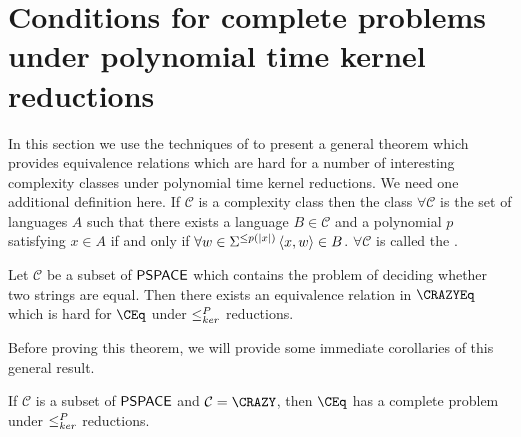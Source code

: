 \section{Conditions for complete problems under polynomial time kernel reductions}
\label{sec:generalcompleteness}

In this section we use the techniques of \autocite[Theorem~8.7]{bcffm} to present a general theorem which provides equivalence relations which are hard for a number of interesting complexity classes under polynomial time kernel reductions.
We need one additional definition here.
If $\mathcal{C}$ is a complexity class then the class $\forall\mathcal{C}$ is the set of languages $A$ such that there exists a language $B\in\mathcal{C}$ and a polynomial $p$ satisfying $x\in A$ if and only if $\forall w\in\Sigma^{\leq p(|x|)} \left\langle x,w\right\rangle\in B$.
$\forall\mathcal{C}$ is called the .

\begin{theorem}\label{thm:generalcompleteness}
  Let $\mathcal{C}$ be a subset of ${\mathsf{PSPACE}}$ which contains the problem of deciding whether two strings are equal.
  Then there exists an equivalence relation in $\CRAZYEq$ which is hard for $\CEq$ under $\leq^{P}_{ker}$ reductions.
\end{theorem}

Before proving this theorem, we will provide some immediate corollaries of this general result.

\begin{corollary}
  If $\mathcal{C}$ is a subset of ${\mathsf{PSPACE}}$ and $\mathcal{C}=\CRAZY$, then $\CEq$ has a complete problem under $\leq^{P}_{ker}$ reductions.
\end{corollary}

